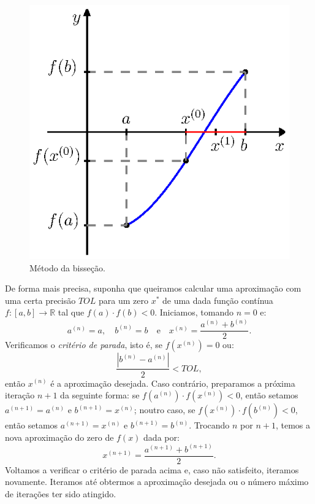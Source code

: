 \begin{figure}
  \centering
  \includegraphics{./cap_equacao1d/pics/metodo_da_bissecao/metodo_da_bissecao.eps}
  \caption{Método da bisseção.}
  \label{fig:metodo_da_bissecao}
\end{figure}

De forma mais precisa, suponha que queiramos calcular uma aproximação com uma certa precisão $TOL$ para um zero $x^*$ de uma dada função contínua $f:[a, b]\to\mathbb{R}$ tal que $f(a)\cdot f(b) < 0$. Iniciamos, tomando $n=0$ e:
\begin{equation*}
  a^{(n)} = a,\quad b^{(n)} = b\quad\text{e}\quad x^{(n)} = \frac{a^{(n)} + b^{(n)}}{2}.
\end{equation*}
Verificamos o \emph{critério de parada}, isto é, se $f(x^{(n)}) = 0$ ou:
\begin{equation*}
  \displaystyle \frac{|b^{(n)} - a^{(n)}|}{2} < TOL,
\end{equation*}
então $x^{(n)}$ é a aproximação desejada. Caso contrário, preparamos a próxima iteração $n+1$ da seguinte forma: se $f(a^{(n)})\cdot f(x^{(n)}) < 0$, então setamos $a^{(n+1)} = a^{(n)}$ e $b^{(n+1)} = x^{(n)}$; noutro caso, se $f(x^{(n)})\cdot f(b^{(n)}) < 0$, então setamos $a^{(n+1)} = x^{(n)}$ e $b^{(n+1)} = b^{(n)}$. Trocando $n$ por $n+1$, temos a nova aproximação do zero de $f(x)$ dada por:
\begin{equation*}
  x^{(n+1)} = \frac{a^{(n+1)} + b^{(n+1)}}{2}.
\end{equation*}
Voltamos a verificar o critério de parada acima e, caso não satisfeito, iteramos novamente. Iteramos até obtermos a aproximação desejada ou o número máximo de iterações ter sido atingido.

